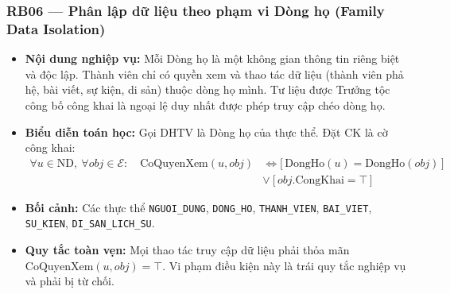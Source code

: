 \subsubsection{RB06 --- Phân lập dữ liệu theo phạm vi Dòng họ (Family Data Isolation)}
\begin{itemize}
    \item \textbf{Nội dung nghiệp vụ:} Mỗi Dòng họ là một không gian thông tin riêng biệt và độc lập. Thành viên chỉ có quyền xem và thao tác dữ liệu (thành viên phả hệ, bài viết, sự kiện, di sản) thuộc dòng họ mình. Tư liệu được Trưởng tộc công bố công khai là ngoại lệ duy nhất được phép truy cập chéo dòng họ.
    \item \textbf{Biểu diễn toán học:} Gọi $\text{DHTV}$ là Dòng họ của thực thể. Đặt $\text{CK}$ là cờ công khai:
    \begin{equation}
        \begin{aligned}
            \forall u \in \text{ND},\ \forall obj \in \mathcal{E}: \quad
            \text{CoQuyenXem}(u, obj)
            &\iff \bigl[\,\text{DongHo}(u) = \text{DongHo}(obj)\,\bigr] \\
            &\lor\ \bigl[\,obj.\text{CongKhai} = \top\,\bigr]
        \end{aligned}
    \end{equation}
    \item \textbf{Bối cảnh:} Các thực thể \texttt{NGUOI\_DUNG}, \texttt{DONG\_HO}, \texttt{THANH\_VIEN}, \texttt{BAI\_VIET}, \texttt{SU\_KIEN}, \texttt{DI\_SAN\_LICH\_SU}.
    \item \textbf{Quy tắc toàn vẹn:} Mọi thao tác truy cập dữ liệu phải thỏa mãn $\text{CoQuyenXem}(u, obj) = \top$. Vi phạm điều kiện này là trái quy tắc nghiệp vụ và phải bị từ chối.
\end{itemize}

